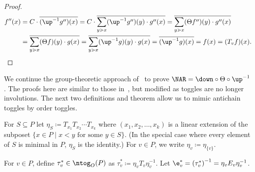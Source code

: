 \begin{proof}
\begin{align*}
f''(x) &=
C\cdot \overline{(\up^{-1}g'')(x)}
=
C\cdot \overline{\sum\limits_{y\gtrdot x}(\up^{-1}g'')(y)
\cdot g''(x)}
=
\overline{\sum\limits_{y\gtrdot x}(\Theta f'')(y)
\cdot g''(x)}\\
&=
\overline{\sum\limits_{y\gtrdot x}(\Theta f)(y)
\cdot g(x)}
=
\overline{\sum\limits_{y\gtrdot x}(\up^{-1}g)(y)
\cdot g(x)}
=
\overline{(\up^{-1}g)(x)}
=f(x)
=(T_v f)(x).\qedhere
\end{align*}
\end{proof}

We continue the group-theoretic approach of~\cite{antichain-toggling} to prove
$\NAR=\down\circ\Theta\circ\up^{-1}$.
The proofs here are similar to those
in~\cite{antichain-toggling}, but modified as
toggles are no longer involutions. The next two definitions and theorem allow us to mimic antichain toggles by order toggles. 

\begin{defi}
For $S\subseteq P$ let $\eta_S\coloneqq T_{x_1}T_{x_2}\cdots T_{x_k}$
where $(x_1,x_2,\dots,x_k)$ is a linear extension of the subposet 
$\{x\in P\;|\;x<y \text{ for some }y\in S\}$. (In the special case where every element of $S$ is minimal in $P$,
$\eta_S$ is the identity.) For $v\in P$, we write $\eta_v\coloneqq \eta_{\{v\}}$. 
\end{defi}

\begin{defi}
For $v\in P$, define $\tau_v^*\in\ntog_O(P)$ as $\tau_v^* \coloneqq \eta_v T_v \eta_v^{-1}$. Let $\e_v^*=\left(\tau_v^*\right)^{-1} = \eta_v E_v \eta_v^{-1}$.
\end{defi}

